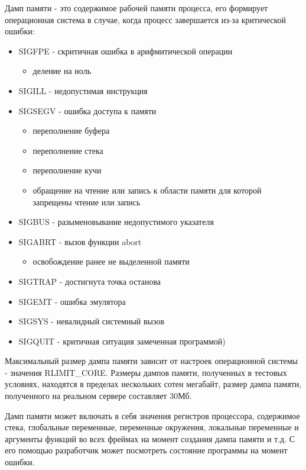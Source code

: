 \documentclass[20pt]{article}
\begin{document}
Дамп памяти\cite{wiki/coredump} - это содержимое рабочей памяти процесса, его
формирует операционная система в случае, когда процесс завершается из-за
критической ошибки\cite{core-dump-signals}:
\begin{itemize}\label{errors}
  \item SIGFPE - скритичная ошибка в арифмитической операции
  \begin{itemize}
    \item деление на ноль
  \end{itemize}
  \item SIGILL - недопустимая инструкция
  \item SIGSEGV - ошибка доступа к памяти
    \begin{itemize}
      \item переполнение буфера\cite{buffer-overflow}
      \item переполнение стека\cite{stack-overflow}
      \item переполнение кучи\cite{heap-overflow}
      \item обращение на чтение или запись к области памяти для которой запрещены
      чтение или запись\cite{memory-corruption}
    \end{itemize}
  \item SIGBUS - разыменовывание недопустимого указателя
  \item SIGABRT - вызов функции abort
    \begin{itemize}
      \item освобождение ранее не выделенной памяти
    \end{itemize}
  \item SIGTRAP - достигнута точка останова
  \item SIGEMT - ошибка эмулятора
  \item SIGSYS - невалидный системный вызов
  \item SIGQUIT - критичная ситуация замеченная программой)\cite{sigquit}
\end{itemize}

Максимальный размер дампа памяти зависит от настроек операционной системы -
значения RLIMIT\_CORE. Размеры дампов памяти, полученных в тестовых условиях,
находятся в пределах нескольких сотен мегабайт, размер дампа памяти, полученного
на реальном сервере составляет 30Мб.

Дамп памяти может включать в себя значения регистров процессора, содержимое стека,
глобальные переменные, переменные окружения, локальные переменные и аргументы
функций во всех фреймах на момент создания дампа памяти и т.д. С его помощью
разработчик может посмотреть состояние программы на момент ошибки.
\end{document}
